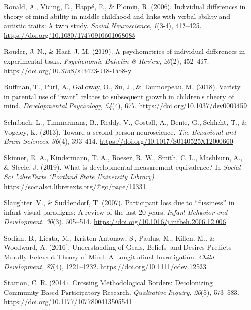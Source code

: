 \documentclass[
]{scrbook}
\newlength{\cslhangindent}
\newenvironment{CSLReferences}[2] %
 {\begin{list}{}{%
  \setlength{\itemindent}{0pt}
  \setlength{\leftmargin}{0pt}
  \setlength{\parsep}{0pt}
  \ifodd #1
   \setlength{\leftmargin}{\cslhangindent}
   \setlength{\itemindent}{-1\cslhangindent}
  \fi
  \setlength{\itemsep}{#2\baselineskip}}}
 {\end{list}}
\begin{document}
\begin{CSLReferences}{1}{0}
Ronald, A., Viding, E., Happé, F., \& Plomin, R. (2006). Individual differences in theory of mind ability in middle childhood and links with verbal ability and autistic traits: {A} twin study. \emph{Social Neuroscience}, \emph{1}(3-4), 412--425. \url{https://doi.org/10.1080/17470910601068088}

Rouder, J. N., \& Haaf, J. M. (2019). A psychometrics of individual differences in experimental tasks. \emph{Psychonomic Bulletin \& Review}, \emph{26}(2), 452--467. \url{https://doi.org/10.3758/s13423-018-1558-y}

Ruffman, T., Puri, A., Galloway, O., Su, J., \& Taumoepeau, M. (2018). Variety in parental use of {``want''} relates to subsequent growth in children's theory of mind. \emph{Developmental Psychology}, \emph{54}(4), 677. \url{https://doi.org/10.1037/dev0000459}

Schilbach, L., Timmermans, B., Reddy, V., Costall, A., Bente, G., Schlicht, T., \& Vogeley, K. (2013). Toward a second-person neuroscience. \emph{The Behavioral and Brain Sciences}, \emph{36}(4), 393--414. \url{https://doi.org/10.1017/S0140525X12000660}

Skinner, E. A., Kindermann, T. A., Roeser, R. W., Smith, C. L., Mashburn, A., \& Steele, J. (2019). What is developmental measurement equivalence? In \emph{Social Sci LibreTexts (Portland State University Library)}. https://socialsci.libretexts.org/@go/page/10331.

Slaughter, V., \& Suddendorf, T. (2007). Participant loss due to {``fussiness''} in infant visual paradigms: {A} review of the last 20 years. \emph{Infant Behavior and Development}, \emph{30}(3), 505--514. \url{https://doi.org/10.1016/j.infbeh.2006.12.006}

Sodian, B., Licata, M., Kristen-Antonow, S., Paulus, M., Killen, M., \& Woodward, A. (2016). Understanding of {Goals}, {Beliefs}, and {Desires Predicts Morally Relevant Theory} of {Mind}: {A Longitudinal Investigation}. \emph{Child Development}, \emph{87}(4), 1221--1232. \url{https://doi.org/10.1111/cdev.12533}

Stanton, C. R. (2014). Crossing {Methodological Borders}: {Decolonizing Community-Based Participatory Research}. \emph{Qualitative Inquiry}, \emph{20}(5), 573--583. \url{https://doi.org/10.1177/1077800413505541}


\end{CSLReferences}
\end{document}
